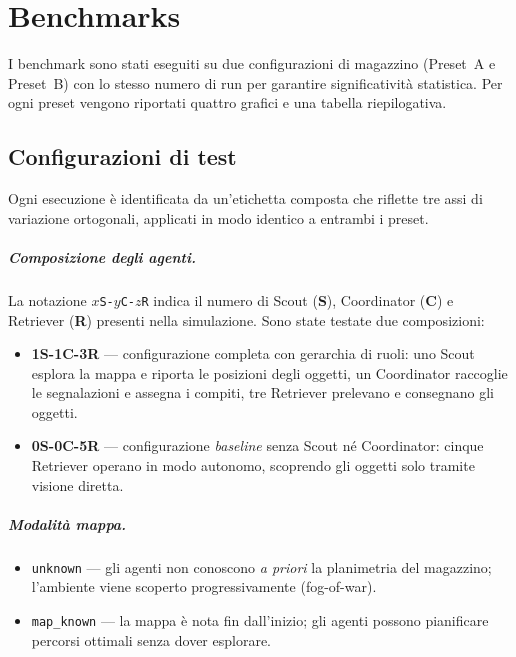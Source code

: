 \chapter{Benchmarks}

I benchmark sono stati eseguiti su due configurazioni di magazzino (Preset~A e Preset~B)
con lo stesso numero di run per garantire significativit\`a statistica.
Per ogni preset vengono riportati quattro grafici e una tabella riepilogativa.

\section*{Configurazioni di test}

Ogni esecuzione \`e identificata da un'etichetta composta che riflette tre assi di variazione
ortogonali, applicati in modo identico a entrambi i preset.

\paragraph{Composizione degli agenti.}
La notazione \texttt{$x$S-$y$C-$z$R} indica il numero di Scout (\textbf{S}), Coordinator
(\textbf{C}) e Retriever (\textbf{R}) presenti nella simulazione.
Sono state testate due composizioni:
\begin{itemize}
  \item \textbf{1S-1C-3R} --- configurazione completa con gerarchia di ruoli: uno Scout esplora
        la mappa e riporta le posizioni degli oggetti, un Coordinator raccoglie le segnalazioni
        e assegna i compiti, tre Retriever prelevano e consegnano gli oggetti.
  \item \textbf{0S-0C-5R} --- configurazione \emph{baseline} senza Scout n\'e Coordinator:
        cinque Retriever operano in modo autonomo, scoprendo gli oggetti solo tramite visione
        diretta.
\end{itemize}

\paragraph{Modalit\`a mappa.}
\begin{itemize}
  \item \texttt{unknown} --- gli agenti non conoscono \textit{a priori} la planimetria del
        magazzino; l'ambiente viene scoperto progressivamente (fog-of-war).
  \item \texttt{map\_known} --- la mappa \`e nota fin dall'inizio; gli agenti possono
        pianificare percorsi ottimali senza dover esplorare.
\end{itemize}

